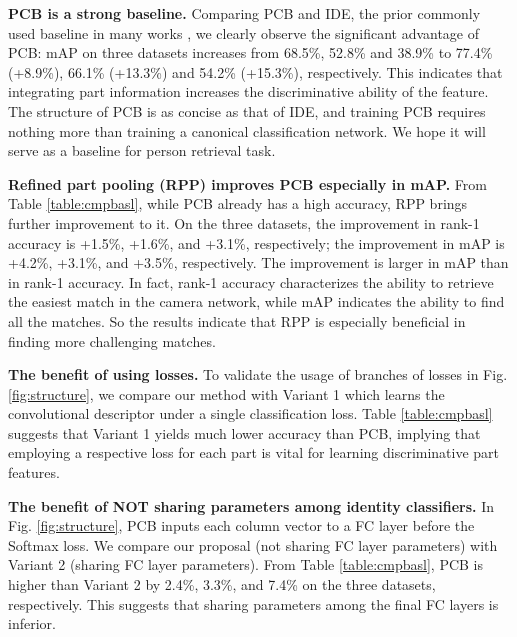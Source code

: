 \documentclass[10pt,twocolumn,letterpaper]{article}
\begin{document}
{{{\textbf{PCB is a strong baseline.}
Comparing PCB and IDE, the prior commonly used baseline in many works \cite{DBLP:journals/corr/ZhengYH16,DBLP:journals/corr/ZhengHLY17,DBLP:conf/cvpr/XiaoLOW16,geng2016deep,Sun2017SVDNet,Zheng2017PAN,zheng2017unlabeled,Zhong2017Random},
we clearly observe the significant advantage of PCB: mAP on three datasets increases from 68.5\%, 52.8\% and 38.9\% to 77.4\% (+8.9\%), 66.1\% (+13.3\%) and 54.2\% (+15.3\%), respectively. This indicates that integrating part information increases the discriminative ability of the feature. The structure of PCB is as concise as that of IDE, and training PCB requires nothing more than training a canonical classification network. We hope it will serve as a baseline for person retrieval task.

\textbf{Refined part pooling (RPP) improves PCB especially in mAP.} From Table \ref{table:cmpbasl}, while PCB already has a high accuracy, RPP brings further improvement to it. On the three datasets, the improvement in rank-1 accuracy is +1.5\%, +1.6\%, and +3.1\%, respectively; the improvement in mAP is +4.2\%, +3.1\%, and +3.5\%, respectively. The improvement is larger in mAP than in rank-1 accuracy. In fact, rank-1 accuracy characterizes the ability to retrieve the easiest match in the camera network, while mAP indicates the ability to find all the matches. So the results indicate that RPP is especially beneficial in finding more challenging matches. 

\textbf{The benefit of using  losses.} To validate the usage of  branches of losses in Fig. \ref{fig:structure}, we compare our method with Variant 1 which learns the convolutional descriptor under a single classification loss. Table \ref{table:cmpbasl} suggests that Variant 1 yields much lower accuracy than PCB, implying that employing a respective loss for each part is vital for learning discriminative part features. 

\textbf{The benefit of NOT sharing parameters among identity classifiers.} In Fig. \ref{fig:structure}, PCB inputs each column vector  to a FC layer before the Softmax loss. We compare our proposal (not sharing FC layer parameters) with Variant 2 (sharing FC layer parameters). From Table \ref{table:cmpbasl}, PCB is higher than Variant 2 by 2.4\%, 3.3\%, and 7.4\% on the three datasets, respectively. This suggests that sharing parameters among the final FC layers is inferior.

}}}
\end{document}

